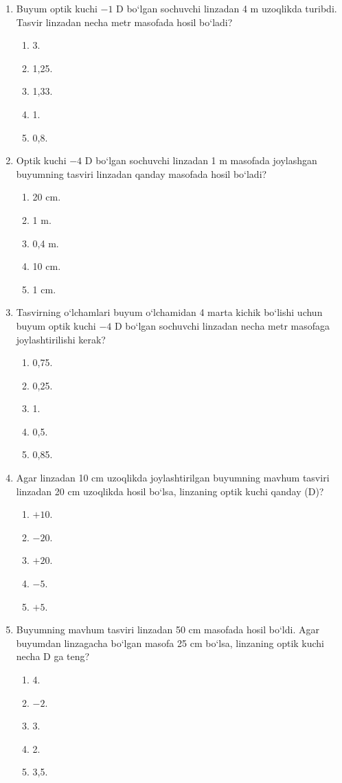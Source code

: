 \begin{enumerate}
\item Buyum optik kuchi $-1$ D bo‘lgan sochuvchi linzadan 4 m uzoqlikda turibdi. Tasvir linzadan necha metr masofada hosil bo‘ladi?
\begin{enumerate}[label=\Alph*)]
\item 3.
\item 1,25.
\item 1,33.
\item 1.
\item 0,8.
\end{enumerate}

\item Optik kuchi $-4$ D bo‘lgan sochuvchi linzadan 1 m masofada joylashgan buyumning tasviri linzadan qanday masofada hosil bo‘ladi?
\begin{enumerate}[label=\Alph*)]
\item 20 cm.
\item 1 m.
\item 0,4 m.
\item 10 cm.
\item 1 cm.
\end{enumerate}

\item Tasvirning o‘lchamlari buyum o‘lchamidan 4 marta kichik bo‘lishi uchun buyum optik kuchi $-4$ D bo‘lgan sochuvchi linzadan necha metr masofaga joylashtirilishi kerak?
\begin{enumerate}[label=\Alph*)]
\item 0,75.
\item 0,25.
\item 1.
\item 0,5.
\item 0,85.
\end{enumerate}

\item Agar linzadan 10 cm uzoqlikda joylashtirilgan buyumning mavhum tasviri linzadan 20 cm uzoqlikda hosil bo‘lsa, linzaning optik kuchi qanday (D)?
\begin{enumerate}[label=\Alph*)]
\item $+10$.
\item $-20$.
\item $+20$.
\item $-5$.
\item $+5$.
\end{enumerate}

\item Buyumning mavhum tasviri linzadan 50 cm masofada hosil bo‘ldi. Agar buyumdan linzagacha bo‘lgan masofa 25 cm bo‘lsa, linzaning optik kuchi necha D ga teng?
\begin{enumerate}[label=\Alph*)]
\item 4.
\item $-2$.
\item 3.
\item 2.
\item 3,5.
\end{enumerate}


\end{enumerate}
